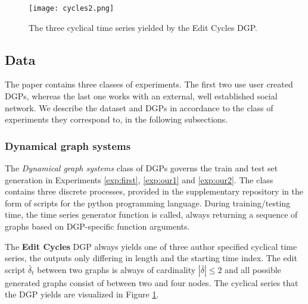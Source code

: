 

\begin{figure}
    \centering
    
    \texttt{[image: cycles2.png]}
    \caption{The three cyclical time series yielded by the Edit Cycles DGP.}
    \label{fig:Cyclical}
\end{figure}
\subsection{Data}
The paper contains three classes of experiments. The first two use user created DGPs, whereas the last one works with an external, well established social network. We describe the dataset and DGPs in accordance to the class of experiments they correspond to, in the following subsections.
\subsubsection{Dynamical graph systems}
\label{sec:DGS}
The \textit{Dynamical graph systems} class of DGPs governs the train and test set generation in Experiments \ref{exp:first}, \ref{exp:our1} and \ref{exp:our2}. The class contains three discrete processes, provided in the supplementary repository in the form of scripts for the python programming language. During training/testing time, the time series generator function is called, always returning a sequence of graphs based on DGP-specific function arguments.

The \textbf{Edit Cycles} DGP always yields one of three author specified cyclical time series, the outputs only differing in length and the starting time index. The edit script $\bar{\delta}_{t}$ between two graphs is always of cardinality $|\bar{\delta}| \leq 2$ and all possible generated graphs consist of between two and four nodes. The cyclical series that the DGP yields are visualized in Figure \ref{fig:Cyclical}.

